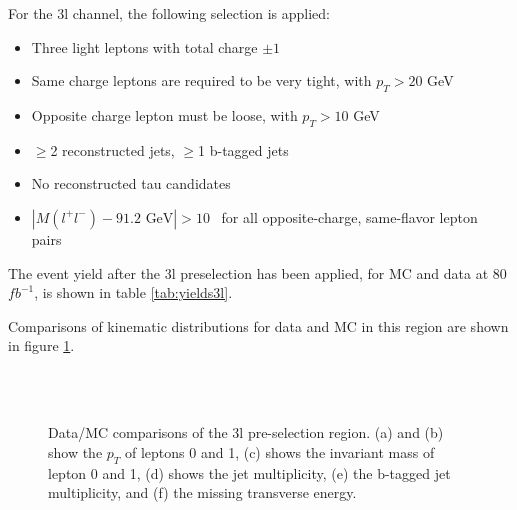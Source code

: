 For the 3l channel, the following selection is applied:

\begin{itemize}
  \item Three light leptons with total charge $\pm 1$
  \item Same charge leptons are required to be very tight, with $p_T > 20$ GeV
  \item Opposite charge lepton must be loose, with $p_T > 10$ GeV
  \item $\geq$2 reconstructed jets, $\geq$1 b-tagged jets                                              
  \item No reconstructed tau candidates
  \item $|M(l^+l^-)-91.2\textrm{ GeV}| > 10$~\GeV{} for all opposite-charge, same-flavor lepton pairs
\end{itemize}

The event yield after the 3l preselection has been applied, for MC and data at 80 $fb^{-1}$, is shown in table \ref{tab:yields3l}.



Comparisons of kinematic distributions for data and MC in this region are shown in figure \ref{fig:presel3l}.

\begin{figure}[h!]
    \\                             
    \\                         
    \caption{Data/MC comparisons of the 3l pre-selection region. (a) and (b) show the $p_T$ of leptons 0 and 1, (c) shows the invariant mass of lepton 0 and 1, (d) shows the jet multiplicity, (e) the b-tagged jet multiplicity, and (f) the missing transverse energy.}
    \label{fig:presel3l}                                                                                          
\end{figure}

